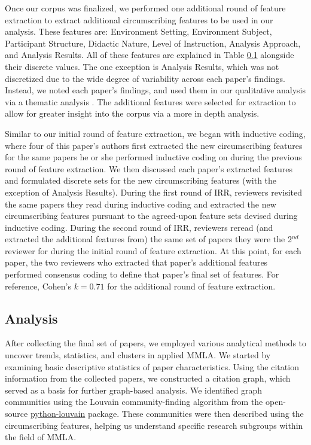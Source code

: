 \documentclass[manuscript,screen,review]{acmart}
\begin{document}
Once our corpus was finalized, we performed one additional round of feature extraction to extract additional circumscribing features to be used in our analysis. These features are: Environment Setting, Environment Subject, Participant Structure, Didactic Nature, Level of Instruction, Analysis Approach, and Analysis Results. All of these features are explained in Table \ref{} alongside their discrete values. The one exception is Analysis Results, which was not discretized due to the wide degree of variability across each paper's findings. Instead, we noted each paper's findings, and used them in our qualitative analysis via a thematic analysis \cite{}. The additional features were selected for extraction to allow for greater insight into the corpus via a more in depth analysis.

Similar to our initial round of feature extraction, we began with inductive coding, where four of this paper's authors first extracted the new circumscribing features for the same papers he or she performed inductive coding on during the previous round of feature extraction. We then discussed each paper's extracted features and formulated discrete sets for the new circumscribing features (with the exception of Analysis Results). During the first round of IRR, reviewers revisited the same papers they read during inductive coding and extracted the new circumscribing features pursuant to the agreed-upon feature sets devised during inductive coding. During the second round of IRR, reviewers reread (and extracted the additional features from) the same set of papers they were the 2$^{nd}$ reviewer for during the initial round of feature extraction. At this point, for each paper, the two reviewers who extracted that paper's additional features performed consensus coding to define that paper's final set of features. For reference, Cohen's $k=0.71$ for the additional round of feature extraction.

\subsection{Analysis}
After collecting the final set of papers, we employed various analytical methods to uncover trends, statistics, and clusters in applied MMLA. We started by examining basic descriptive statistics of paper characteristics. Using the citation information from the collected papers, we constructed a citation graph, which served as a basis for further graph-based analysis. We identified graph communities using the Louvain community-finding algorithm from the open-source \href{https://github.com/taynaud/python-louvain}{python-louvain} package. These communities were then described using the circumscribing features, helping us understand specific research subgroups within the field of MMLA.    
\end{document}
